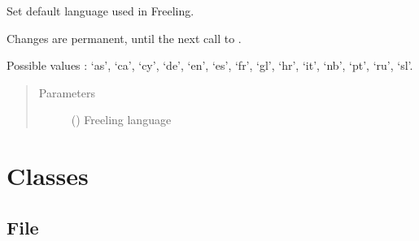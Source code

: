 \documentclass[letterpaper,10pt,english]{sphinxmanual}
\begin{document}

\begin{fulllineitems}
\label{\detokenize{configuration:loacore.conf.set_lang}}
Set default language used in Freeling.

Changes are permanent, until the next call to {\hyperref[\detokenize{configuration:loacore.conf.set_lang}]{}}.

Possible values : ‘as’, ‘ca’, ‘cy’, ‘de’, ‘en’, ‘es’, ‘fr’, ‘gl’, ‘hr’, ‘it’, ‘nb’, ‘pt’, ‘ru’, ‘sl’.
\begin{quote}\begin{description}
\item[{Parameters}] \leavevmode
{} () \textendash{} Freeling language

\end{description}\end{quote}

\end{fulllineitems}



\chapter{Classes}
\label{\detokenize{classes:classes}}\label{\detokenize{classes::doc}}

\section{File}
\label{\detokenize{classes:file}}
\end{document}
